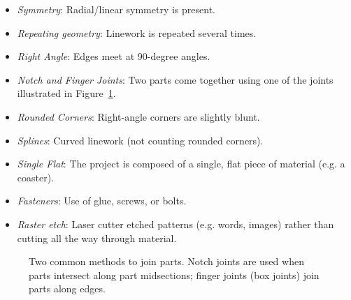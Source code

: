 \documentclass{article}
\begin{document}
\begin{itemize}
\item \textit{Symmetry}: Radial/linear symmetry is present.
\item \textit{Repeating geometry}: Linework is repeated several times.
\item \textit{Right Angle}: Edges meet at 90-degree angles.
\item \textit{Notch and Finger Joints}: Two parts come together using one of
  the joints illustrated in Figure~\ref{fig:joint}.
\item \textit{Rounded Corners}: Right-angle corners are slightly blunt.
\item \textit{Splines}: Curved linework (not counting rounded corners).
\item \textit{Single Flat}: The project is composed of a single, flat
  piece of material (e.g. a coaster).
\item \textit{Fasteners}: Use of glue, screws, or bolts.
\item \textit{Raster etch}: Laser cutter etched patterns (e.g. words,
  images) rather than cutting all the way through material.
\end{itemize}

\begin{figure}[h]
\centering 
{}
\caption{Two common methods to join parts. Notch joints are used when
  parts intersect along part midsections; finger joints (box joints)
  join parts along edges.}
\label{fig:joint}
\end{figure}
\end{document}
